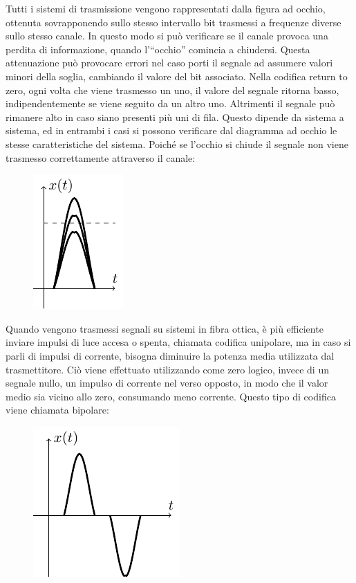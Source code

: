 \documentclass{article}
\numberwithin{equation}{subsection}
\begin{document}
Tutti i sistemi di trasmissione vengono rappresentati dalla figura ad occhio, ottenuta sovrapponendo sullo stesso intervallo bit trasmessi a frequenze diverse sullo 
stesso canale. In questo modo si può verificare se il canale provoca una perdita di informazione, quando l'``occhio'' comincia a chiudersi. Questa attenuazione può 
provocare errori nel caso porti il 
segnale ad assumere valori minori della soglia, cambiando il valore del bit associato. 
Nella codifica return to zero, ogni volta che viene trasmesso un uno, il valore del segnale ritorna basso, indipendentemente se viene seguito da un altro uno. Altrimenti 
il segnale può rimanere alto in caso siano presenti più uni di fila. Questo dipende da sistema a sistema, ed in entrambi i casi si possono verificare dal diagramma ad occhio 
le stesse caratteristiche del sistema. Poiché se l'occhio si chiude il segnale non viene trasmesso correttamente attraverso il canale:
\begin{figure}[H]%
    \centering
    \includegraphics{diagramma-occhio.pdf}%
\end{figure}    
Quando vengono trasmessi segnali su sistemi in fibra ottica, è più efficiente inviare impulsi di luce accesa o spenta, chiamata codifica unipolare, ma in caso si parli di impulsi di corrente, 
bisogna diminuire la potenza media utilizzata dal trasmettitore. Ciò viene effettuato utilizzando come zero logico, invece di un segnale nullo, un impulso di corrente nel 
verso opposto, in modo che il valor medio sia vicino allo zero, consumando meno corrente. Questo tipo di codifica viene chiamata bipolare:
\begin{figure}[H]%
    \centering
    \includegraphics{modulazione-corrente.pdf}%
\end{figure}
\end{document}
